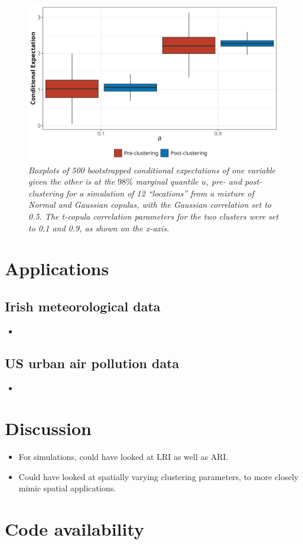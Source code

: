 \documentclass{article}
\numberwithin{equation}{section}
\begin{document}
\begin{figure}[H]
    \centering
    \includegraphics[width = 0.9\linewidth]{plots/sim_01e_bootstrap_box.png}
    \caption{\emph{Boxplots of 500 bootstrapped conditional expectations of one variable given the other is at the $98\%$ marginal quantile $u$, pre- and post-clustering for a simulation of 12 ``locations'' from a mixture of Normal and Gaussian copulas, with the Gaussian correlation set to 0.5. The t-copula correlation parameters for the two clusters were set to 0.1 and 0.9, as shown on the x-axis.}}
    \label{fig:04_bootstrap}
\end{figure}


\section{Applications}
\subsection{Irish meteorological data} \label{subsec:app_irl}

\begin{itemize}
    \item 
\end{itemize}

\subsection{US urban air pollution data} \label{subsec:app_us}

\begin{itemize}
    \item 
\end{itemize}

\section{Discussion}

\begin{itemize}
  \item For simulations, could have looked at LRI as well as ARI.
  \item Could have looked at spatially varying clustering parameters, to more closely mimic spatial applications. 
\end{itemize}

\section*{Code availability}

\newpage

\end{document}
